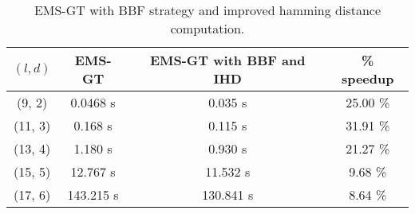 \begin{table}[h] %
	\renewcommand{\arraystretch}{1.3}
	\centering
	\begin{tabular}{|c|c|c|c|}
	\hline 
	\bfseries\boldmath $(l,d)$ & 
	\bfseries\boldmath EMS-GT & 
	\bfseries\boldmath EMS-GT with BBF and IHD & 
	\bfseries \% speedup\\
	\hline
	(9, 2) & 0.0468 s &		0.035 s 	&	25.00 \%\\
	(11, 3) & 0.168 s &		0.115 s 	&	31.91 \%\\
	(13, 4) & 1.180 s &		0.930 s 	&	21.27 \%\\
	(15, 5) & 12.767 s &	11.532 s  	&	9.68 \%\\
	(17, 6) & 143.215 s &	130.841 s 	&	8.64 \%\\
	\hline\end{tabular}
	
	\caption{EMS-GT with BBF strategy and improved hamming distance computation.}
	\label{tbl:ems-gt-bf-speedup}
\end{table}


